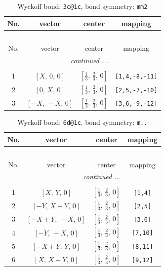 \documentclass[fleqn,8pt]{jsarticle}
\begin{document}
\begin{longtable}{cccc}
\caption{Wyckoff bond: {\tt 3c@1c}, bond symmetry: {\tt mm2}}
 \\
 \hline \hline
No. & vector & center & mapping \\ \hline \endfirsthead

\multicolumn{3}{l}{\tablename\ \thetable{}} \\
 \hline \hline
No. & vector & center & mapping \\ \hline \endhead

 \hline \hline
\multicolumn{3}{r}{\footnotesize\it continued ...} \\ \endfoot

 \hline \hline
\multicolumn{3}{r}{} \\ \endlastfoot

1 & $\left[ X,\, 0,\, 0 \right]$ & $\left[ \frac{1}{3},\, \frac{2}{3},\, 0 \right]$ & {\tt [1,4,-8,-11]} \\ \hline
2 & $\left[ 0,\, X,\, 0 \right]$ & $\left[ \frac{1}{3},\, \frac{2}{3},\, 0 \right]$ & {\tt [2,5,-7,-10]} \\ \hline
3 & $\left[ - X,\, - X,\, 0 \right]$ & $\left[ \frac{1}{3},\, \frac{2}{3},\, 0 \right]$ & {\tt [3,6,-9,-12]} \\
\end{longtable}
\renewcommand{\arraystretch}{1.2}
\begin{longtable}{cccc}
\caption{Wyckoff bond: {\tt 6d@1c}, bond symmetry: {\tt m..}}
 \\
 \hline \hline
No. & vector & center & mapping \\ \hline \endfirsthead

\multicolumn{3}{l}{\tablename\ \thetable{}} \\
 \hline \hline
No. & vector & center & mapping \\ \hline \endhead

 \hline \hline
\multicolumn{3}{r}{\footnotesize\it continued ...} \\ \endfoot

 \hline \hline
\multicolumn{3}{r}{} \\ \endlastfoot

1 & $\left[ X,\, Y,\, 0 \right]$ & $\left[ \frac{1}{3},\, \frac{2}{3},\, 0 \right]$ & {\tt [1,4]} \\ \hline
2 & $\left[ - Y,\, X - Y,\, 0 \right]$ & $\left[ \frac{1}{3},\, \frac{2}{3},\, 0 \right]$ & {\tt [2,5]} \\ \hline
3 & $\left[ - X + Y,\, - X,\, 0 \right]$ & $\left[ \frac{1}{3},\, \frac{2}{3},\, 0 \right]$ & {\tt [3,6]} \\ \hline
4 & $\left[ - Y,\, - X,\, 0 \right]$ & $\left[ \frac{1}{3},\, \frac{2}{3},\, 0 \right]$ & {\tt [7,10]} \\ \hline
5 & $\left[ - X + Y,\, Y,\, 0 \right]$ & $\left[ \frac{1}{3},\, \frac{2}{3},\, 0 \right]$ & {\tt [8,11]} \\ \hline
6 & $\left[ X,\, X - Y,\, 0 \right]$ & $\left[ \frac{1}{3},\, \frac{2}{3},\, 0 \right]$ & {\tt [9,12]} \\
\end{longtable}
\end{document}
